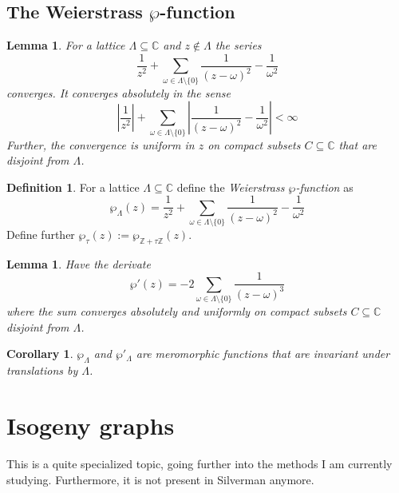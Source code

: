 \documentclass{scrartcl}
\newcommand{\Z}{\mathbb{Z}}
\newcommand{\C}{\mathbb{C}}
\newtheorem{lemma}[prop]{Lemma}
\newtheorem{corollary}[prop]{Corollary}
\theoremstyle{definition}
\newtheorem{definition}[prop]{Definition}
\begin{document}
\subsection{The Weierstrass $\wp$-function}
\begin{lemma}
    For a lattice $\Lambda \subseteq \C$ and $z \notin \Lambda$ the series
    \begin{equation*}
        \frac 1 {z^2} + \sum_{\omega \in \Lambda \setminus \{0\}} \frac 1 {(z - \omega)^2} - \frac 1 {\omega^2}
    \end{equation*}
    converges.
    It converges absolutely in the sense
    \begin{equation*}
        \left| \frac 1 {z^2} \right| + \sum_{\omega \in \Lambda \setminus \{0\}} \left| \frac 1 {(z - \omega)^2} - \frac 1 {\omega^2} \right| < \infty
    \end{equation*}
    Further, the convergence is uniform in $z$ on compact subsets $C \subseteq \C$ that are disjoint from $\Lambda$.
\end{lemma}
\begin{definition}
    For a lattice $\Lambda \subseteq \C$ define the \emph{Weierstrass $\wp$-function} as
    \begin{equation*}
        \wp_\Lambda(z) = \frac 1 {z^2} + \sum_{\omega \in \Lambda \setminus \{0\}} \frac 1 {(z - \omega)^2} - \frac 1 {\omega^2}
    \end{equation*}
    Define further $\wp_{\tau}(z) := \wp_{\Z + \tau\Z}(z)$.
\end{definition}
\begin{lemma}
    Have the derivate
    \begin{equation*}
        \wp'(z) = -2\sum_{\omega \in \Lambda \setminus \{0\}} \frac 1 {(z - \omega)^3}
    \end{equation*}
    where the sum converges absolutely and uniformly on compact subsets $C \subseteq \C$ disjoint from $\Lambda$.
\end{lemma}
\begin{corollary}
    $\wp_\Lambda$ and $\wp'_\Lambda$ are meromorphic functions that are invariant under translations by $\Lambda$.
\end{corollary}

\section{Isogeny graphs}
This is a quite specialized topic, going further into the methods I am currently studying.
Furthermore, it is not present in Silverman anymore.
\end{document}
